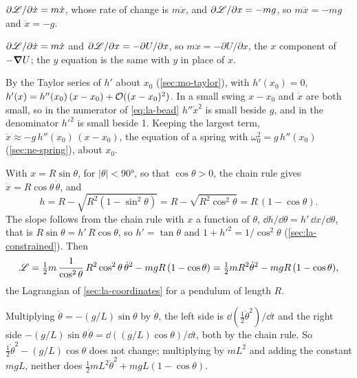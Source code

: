 $\partial\mathscr{L}/\partial\dot{x} = m\dot{x}$, whose
rate of change is $m\ddot{x}$, and $\partial\mathscr{L}/\partial x = -mg$, so
$m\ddot{x} = -mg$ and $\ddot{x} = -g$.

$\partial\mathscr{L}/\partial\dot{x} = m\dot{x}$ and
$\partial\mathscr{L}/\partial x = -\partial U/\partial x$, so $m\ddot{x} =
-\partial U/\partial x$, the $x$ component of $-\bm{\nabla} U$; the $y$ equation
is the same with $y$ in place of $x$.

By the Taylor series of $h'$ about $x_0$
(\cref{sec:mo-taylor}), with $h'(x_0) = 0$, $h'(x) = h''(x_0)\,(x - x_0) +
\mathcal{O}((x - x_0)^2)$. In a small swing $x - x_0$ and $\dot{x}$ are both
small, so in the numerator of \cref{eq:la-bead} $h''\dot{x}^2$ is small
beside $g$, and in the denominator $h'^2$ is small beside 1. Keeping the largest term,
$\ddot{x} \approx -g\,h''(x_0)\,(x - x_0)$, the equation of a spring with
$\omega_0^2 = g\,h''(x_0)$ (\cref{sec:ne-spring}), about $x_0$.

With $x = R\sin\theta$, for $\lvert\theta\rvert <
\ang{90}$, so that $\cos\theta > 0$, the chain rule gives $\dot{x} =
R\cos\theta\,\dot\theta$, and
\begin{equation*}
   h = R - \sqrt{R^2(1 - \sin^2\theta)} = R - \sqrt{R^2\cos^2\theta}
   = R\,(1 - \cos\theta) .
\end{equation*}
The slope follows from the chain rule with $x$ a function of $\theta$,
$\dd h/\dd\theta = h'\,\dd x/\dd\theta$, that is $R\sin\theta =
h'\,R\cos\theta$, so $h' = \tan\theta$ and $1 + h'^2 = 1/\cos^2\theta$
(\cref{sec:la-constrained}). Then
\begin{equation*}
   \mathscr{L} = \tfrac12 m\,\frac{1}{\cos^2\theta}\,R^2\cos^2\theta\,\dot\theta^2
   - mgR\,(1 - \cos\theta) = \tfrac12 mR^2\dot\theta^2 - mgR\,(1 - \cos
   \theta) ,
\end{equation*}
the Lagrangian of \cref{sec:la-coordinates} for a pendulum of length $R$.

Multiplying $\ddot\theta = -(g/L)\sin\theta$ by
$\dot\theta$, the left side is $\dd(\frac12\dot\theta^2)/\dd t$ and the
right side $-(g/L)\sin\theta\,\dot\theta = \dd((g/L)\cos\theta)/\dd t$,
both by the chain rule. So $\frac12\dot\theta^2 - (g/L)\cos\theta$ does not
change; multiplying by $mL^2$ and adding the constant $mgL$, neither does
$\frac12 mL^2\dot\theta^2 + mgL(1 - \cos\theta)$.


